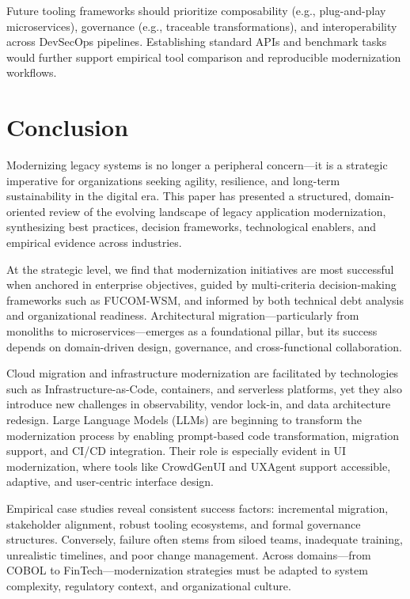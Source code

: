 \documentclass[12pt]{article}
\begin{document}
Future tooling frameworks should prioritize composability (e.g., plug-and-play microservices), governance (e.g., traceable transformations), and interoperability across DevSecOps pipelines. Establishing standard APIs and benchmark tasks would further support empirical tool comparison and reproducible modernization workflows.


\section{Conclusion}

Modernizing legacy systems is no longer a peripheral concern—it is a strategic imperative for organizations seeking agility, resilience, and long-term sustainability in the digital era. This paper has presented a structured, domain-oriented review of the evolving landscape of legacy application modernization, synthesizing best practices, decision frameworks, technological enablers, and empirical evidence across industries.

At the strategic level, we find that modernization initiatives are most successful when anchored in enterprise objectives, guided by multi-criteria decision-making frameworks such as FUCOM-WSM, and informed by both technical debt analysis and organizational readiness. Architectural migration—particularly from monoliths to microservices—emerges as a foundational pillar, but its success depends on domain-driven design, governance, and cross-functional collaboration.

Cloud migration and infrastructure modernization are facilitated by technologies such as Infrastructure-as-Code, containers, and serverless platforms, yet they also introduce new challenges in observability, vendor lock-in, and data architecture redesign. Large Language Models (LLMs) are beginning to transform the modernization process by enabling prompt-based code transformation, migration support, and CI/CD integration. Their role is especially evident in UI modernization, where tools like CrowdGenUI and UXAgent support accessible, adaptive, and user-centric interface design.

Empirical case studies reveal consistent success factors: incremental migration, stakeholder alignment, robust tooling ecosystems, and formal governance structures. Conversely, failure often stems from siloed teams, inadequate training, unrealistic timelines, and poor change management. Across domains—from COBOL to FinTech—modernization strategies must be adapted to system complexity, regulatory context, and organizational culture.
\end{document}
